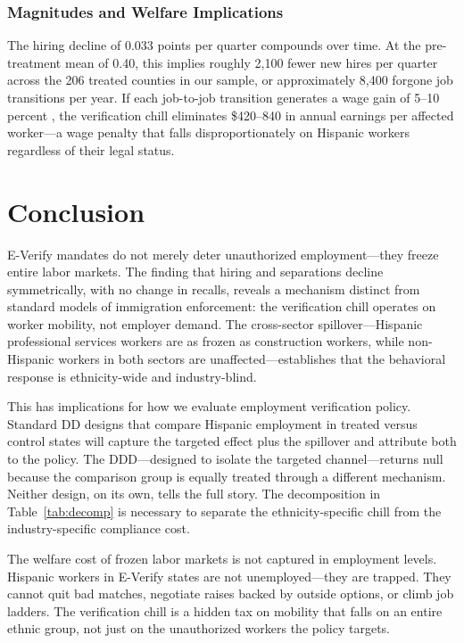\documentclass[12pt]{article}
\begin{document}
\subsubsection*{Magnitudes and Welfare Implications} The hiring decline of 0.033 points per quarter compounds over time. At the pre-treatment mean of 0.40, this implies roughly 2,100 fewer new hires per quarter across the 206 treated counties in our sample, or approximately 8,400 forgone job transitions per year. If each job-to-job transition generates a wage gain of 5--10 percent \citep{haltiwanger2018declining}, the verification chill eliminates \$420--840 in annual earnings per affected worker---a wage penalty that falls disproportionately on Hispanic workers regardless of their legal status.

\section{Conclusion}
\label{sec:conclusion}

E-Verify mandates do not merely deter unauthorized employment---they freeze entire labor markets. The finding that hiring and separations decline symmetrically, with no change in recalls, reveals a mechanism distinct from standard models of immigration enforcement: the verification chill operates on worker mobility, not employer demand. The cross-sector spillover---Hispanic professional services workers are as frozen as construction workers, while non-Hispanic workers in both sectors are unaffected---establishes that the behavioral response is ethnicity-wide and industry-blind.

This has implications for how we evaluate employment verification policy. Standard DD designs that compare Hispanic employment in treated versus control states will capture the targeted effect plus the spillover and attribute both to the policy. The DDD---designed to isolate the targeted channel---returns null because the comparison group is equally treated through a different mechanism. Neither design, on its own, tells the full story. The decomposition in Table~\ref{tab:decomp} is necessary to separate the ethnicity-specific chill from the industry-specific compliance cost.

The welfare cost of frozen labor markets is not captured in employment levels. Hispanic workers in E-Verify states are not unemployed---they are trapped. They cannot quit bad matches, negotiate raises backed by outside options, or climb job ladders. The verification chill is a hidden tax on mobility that falls on an entire ethnic group, not just on the unauthorized workers the policy targets.
\end{document}
